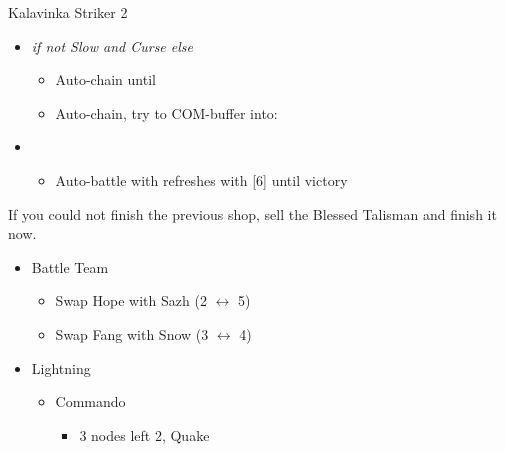 \begin{multicols}{2}
\begin{battle}[1:28]{Kalavinka Striker 2}
\begin{itemize}
\begin{itemize}
			      \end{itemize}
			\item \second \textit{ if not Slow and Curse else} \fourth
			      \begin{itemize}
				      \item Auto-chain until \stagger
				      \item Auto-chain, try to COM-buffer into:
			      \end{itemize}
			\item \fifth
			      \begin{itemize}
				      \item Auto-battle with refreshes with [6] until victory
			      \end{itemize}
		\end{itemize}
	\end{battle}
	If you could not finish the previous shop, sell the Blessed Talisman and finish it now.
	\vfill
	\renewcommand{\first}{[1] Strike Team (\com/\syn/\com)}
	\renewcommand{\second}{[2] Tri-Disaster (\rav/\rav/\rav)}
	\renewcommand{\third}{[3] Tri-Disaster (\rav/\rav/\rav)}
	\renewcommand{\fourth}{[4] Cerberus (\com/\com/\com)}
	\renewcommand{\fifth}{[5] Cerberus (\com/\com/\com)}
	\begin{menu}
		\begin{itemize}
			\paradigm
			\begin{itemize}
				\item Battle Team
				      \begin{itemize}
					      \item Swap Hope with Sazh (2 $\leftrightarrow$ 5)
					      \item Swap Fang with Snow (3 $\leftrightarrow$ 4)
				      \end{itemize}
				      {\paradigmline[1]{\textit{\com}}{\textit{\syn}}{\textit{(\com)}}}%
				      {\paradigmline{(\rav)}{\rav}{\rav}}%
				      {\paradigmline{[\rav]}{(\rav)}{(\rav)}}%
				      {\paradigmline{\com}{[\com]}{\com}}%
				      {\paradigmline{\com}{[\com]}{\com}}
			\end{itemize}
			\crystarium
			\begin{itemize}
				\item Lightning
				      \begin{itemize}
					      \item Commando
					            \begin{itemize}
						            \item 3 nodes left 2, Quake

\end{itemize}
\end{itemize}
\end{itemize}
\end{itemize}
\end{menu}
\end{multicols}
